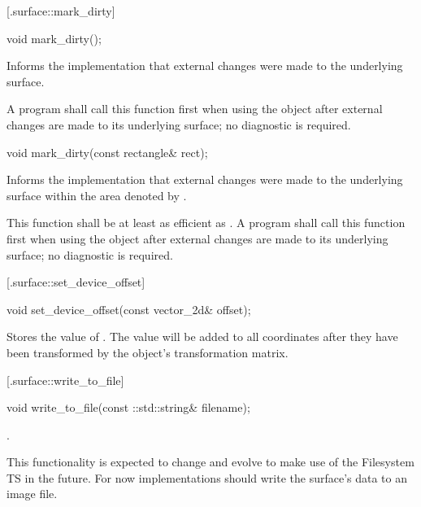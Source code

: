  [\iotwod.surface::mark_dirty] {}

%
%
\begin{itemdecl}
void mark_dirty();
\end{itemdecl}
\begin{itemdescr}
	\pnum
	\effects
	Informs the implementation that external changes were made to the underlying surface.
	
	\pnum
	\remarks
	A program shall call this function first when using the  object after external changes are made to its underlying surface; no diagnostic is required.
\end{itemdescr}

\begin{itemdecl}
void mark_dirty(const rectangle& rect);
\end{itemdecl}
\begin{itemdescr}
	\pnum
	\effects
	Informs the implementation that external changes were made to the underlying surface within the area denoted by .
	
	\pnum
	\remarks
	This function shall be at least as efficient as . A program shall call this function first when using the  object after external changes are made to its underlying surface; no diagnostic is required.
\end{itemdescr}

 [\iotwod.surface::set_device_offset] {}

%
%
\begin{itemdecl}
void set_device_offset(const vector_2d& offset);
\end{itemdecl}
\begin{itemdescr}
	\pnum
	\effects
	Stores the value of . The value will be added to all coordinates after they have been transformed by the  object's transformation matrix.
\end{itemdescr}

 [\iotwod.surface::write_to_file] {}

%
%
\begin{itemdecl}
void write_to_file(const ::std::string& filename);
\end{itemdecl}
\begin{itemdescr}
	\pnum
	\effects
	.
	
	\pnum
	\realnotes
	This functionality is expected to change and evolve to make use of the Filesystem TS in the future. For now implementations should write the surface's data to an image file.
\end{itemdescr}

